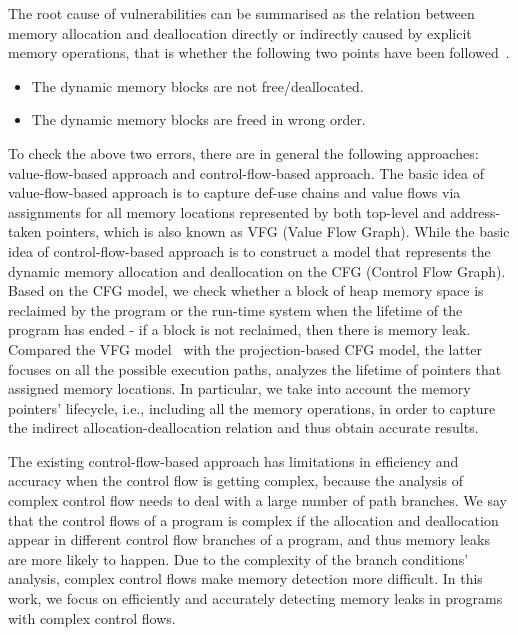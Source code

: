 The root cause of vulnerabilities can be summarised as the relation between memory allocation and deallocation directly or indirectly caused by explicit memory operations, that is whether the following two points have been followed~\cite{AJ06}.
\begin{itemize}
\item	The dynamic memory blocks are not free/deallocated.
\item	The dynamic memory blocks are freed in wrong order.
\end{itemize}
To check the above two errors, there are in general the following approaches: value-flow-based approach and control-flow-based approach. The basic idea of value-flow-based approach is to capture def-use chains and value flows via assignments for all memory locations represented by both top-level and address-taken pointers, which is also known as VFG (Value Flow Graph). While the basic idea of control-flow-based approach is to construct a model that represents the dynamic memory allocation and deallocation on the CFG (Control Flow Graph). Based on the CFG model, we check whether a block of heap memory space is reclaimed by the program or the run-time system when the lifetime of the program has ended - if a block is not reclaimed, then there is memory leak. Compared the VFG model~\cite{SYX12} with the projection-based CFG model, the latter focuses on all the possible execution paths, analyzes the lifetime of pointers that assigned memory locations. %
In particular, we take into account the memory pointers' lifecycle, i.e., including all the memory operations, in order to capture the indirect allocation-deallocation relation and thus obtain accurate results.

The existing control-flow-based approach has limitations in efficiency and accuracy when the control flow is getting complex, because the analysis of complex control flow needs to deal with a large number of path branches. %
We say that the control flows of a program is complex if the allocation and deallocation appear in different control flow branches of a program, and thus memory leaks are more likely to happen. Due to the complexity of the branch conditions' analysis, complex control flows make memory detection more difficult. %
In this work, we focus on efficiently and accurately detecting memory leaks in programs with complex control flows.  

